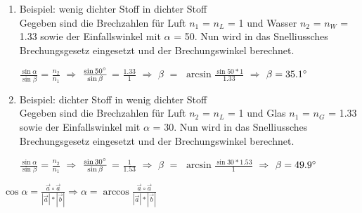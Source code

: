 \begin{enumerate}
\item Beispiel: wenig dichter Stoff in dichter Stoff\\
Gegeben sind die Brechzahlen für Luft $n_1$ = $n_L$ = 1 und Wasser $n_2$ = $n_W$ = 1.33 sowie der Einfallswinkel mit $\alpha$ = 50\degree.
Nun wird in das Snelliussches Brechungsgesetz eingesetzt und der Brechungswinkel berechnet.
\begin{center}
$\frac{\sin\alpha}{\sin\beta}$ = $\frac{n_2}{n_1}$ $\Rightarrow$ $\frac{\sin 50\degree}{\sin\beta}$ = $\frac{1.33}{1}$ $\Rightarrow$ $\beta$ $=$  $\arcsin\frac{\sin 50 * 1}{1.33}$ $\Rightarrow$ $\beta = 35.1\degree$
\end{center}

\item Beispiel: dichter Stoff in wenig dichter Stoff\\
Gegeben sind die Brechzahlen für Luft $n_2$ = $n_L$ = 1 und Glas $n_1$ = $n_G$ = 1.33 sowie der Einfallswinkel mit $\alpha$ = 30\degree.
Nun wird in das Snelliussches Brechungsgesetz eingesetzt und der Brechungswinkel berechnet.
\begin{center}
$\frac{\sin\alpha}{\sin\beta}$ = $\frac{n_2}{n_1}$ $\Rightarrow$ $\frac{\sin 30\degree}{\sin\beta}$ = $\frac{1}{1.53}$ $\Rightarrow$ $\beta$ $=$  $\arcsin\frac{\sin 30 * 1.53}{1}$ $\Rightarrow$ $\beta = 49.9\degree$
\end{center}
\end{enumerate}

$\cos\alpha = \frac{\vec{a} \circ \vec{a}}{|\vec{a}| * |\vec{b}|} \Rightarrow  \alpha = \arccos \frac{\vec{a} \circ \vec{a}}{|\vec{a}| * |\vec{b}|}$


\newpage